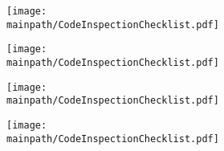 \documentclass[\mainpath/main]{subfiles}
\begin{document}
\label{AppendixA:CodeInspectionChecklist}

\setmyfancystyle

\begin{figure}[h!]
	\centering
	\texttt{[image: \\mainpath/CodeInspectionChecklist.pdf]}
\end{figure}
\begin{figure}[h!]
	\centering
	\texttt{[image: \\mainpath/CodeInspectionChecklist.pdf]}
\end{figure}
\begin{figure}[h!]
	\centering
	\texttt{[image: \\mainpath/CodeInspectionChecklist.pdf]}
\end{figure}
\begin{figure}[h!]
	\centering
	\texttt{[image: \\mainpath/CodeInspectionChecklist.pdf]}
\end{figure}
\end{document}
